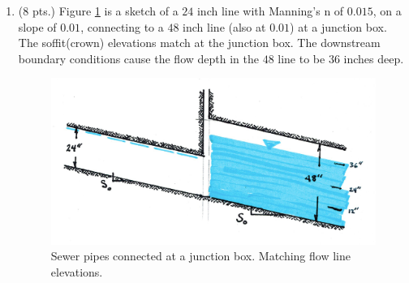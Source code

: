 \documentclass[11pt]{article}
\begin{document}
\begin{enumerate}
\clearpage
\item (8 pts.)
Figure \ref{fig:SewerPipeMatchFlowlineDeep} is a sketch of a $24$ inch line with Manning's n of $0.015$, on a slope of $0.01$, connecting to a $48$ inch line (also at $0.01$) at a junction box.   The soffit(crown) elevations match at the junction box.  The downstream boundary conditions cause the flow depth in the $48$ line to be $36$ inches deep.

\begin{figure}[h!] %
\centering
   \includegraphics[width=4.5in]{SewerPipeMatchFlowlineDeep.jpg}
   \caption{Sewer pipes connected at a junction box.  Matching flow line elevations.}
   \label{fig:SewerPipeMatchFlowlineDeep} 
\end{figure}


\end{enumerate}
\end{document}
